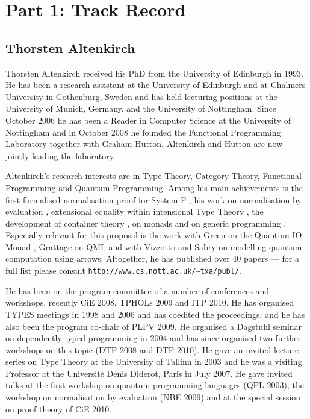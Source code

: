 \documentclass[a4paper]{article}
\begin{document}
%


\section*{Part 1: Track Record}

\subsection*{Thorsten Altenkirch}
Thorsten Altenkirch received his PhD from the University of
Edinburgh in 1993. He has been a research assistant at the University of
Edinburgh and at Chalmers University in Gothenburg, Sweden and has
held lecturing positions at the University of Munich, Germany, and the
University of Nottingham. Since October 2006 he has been a Reader in
Computer Science at the University of Nottingham and in October
2008 he founded the Functional Programming Laboratory together with
Graham Hutton. Altenkirch and Hutton are now jointly leading the
laboratory.

Altenkirch's research interests are in Type Theory, Category Theory, Functional
Programming and Quantum Programming. 
Among his main achievements is
the first formalised normalisation proof for System F
, his work on normalisation by evaluation 
, extensional equality within intensional Type Theory 
, the development of container theory %
, on
monads  
and on generic programming 
.
Especially relevant for this proposal is the
work with Green on the Quantum IO Monad 
, Grattage on QML  and with Vizzotto and Sabry on
modelling quantum computation  using
arrows. Altogether, he has published over 40 papers --- for a full list please
consult \texttt{http://www.cs.nott.ac.uk/\~{}txa/publ/}.

He has been on the program committee of a number of conferences and
workshops, recently CiE 2008, TPHOLs 2009 and ITP 2010. He has
organised TYPES meetings in 1998 and 2006 and has coedited the
proceedings; and he has also been the program co-chair of PLPV 2009.  He
organised a Dagstuhl seminar on dependently typed programming in 2004
and has since organised two further workshops on this topic (DTP 2008
and DTP 2010). He gave an invited lecture series on Type Theory at the
University of Tallinn in 2003 and he was a visiting Professor at the
Universit\`{e} Denis Diderot, Paris in  July 2007. He gave invited talks
at the first workshop on quantum programming languages (QPL 2003), the
workshop on normalisation by evaluation (NBE 2009) and at the special
session on proof theory of CiE 2010.
\end{document}
